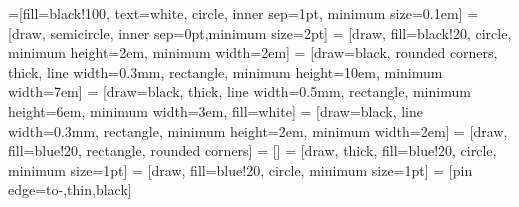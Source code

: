 \usetikzlibrary{shapes,arrows}
\usetikzlibrary{backgrounds}
\usetikzlibrary{matrix, positioning, fit}
\usetikzlibrary{patterns}

 =[fill=black!100, text=white, circle, inner sep=1pt, minimum size=0.1em]
 = [draw, semicircle, inner sep=0pt,minimum size=2pt]
 = [draw, fill=black!20, circle, minimum height=2em, minimum width=2em]
 = [draw=black, rounded corners, thick, line width=0.3mm, rectangle, minimum height=10em, minimum width=7em]
 = [draw=black, thick, line width=0.5mm, rectangle, minimum height=6em, minimum width=3em, fill=white]
 = [draw=black, line width=0.3mm, rectangle, minimum height=2em, minimum width=2em]
 = [draw, fill=blue!20, rectangle, rounded corners]
 = []
 = [draw, thick, fill=blue!20, circle, minimum size=1pt]
 = [draw, fill=blue!20, circle, minimum size=1pt]
 = [pin edge={to-,thin,black}]



